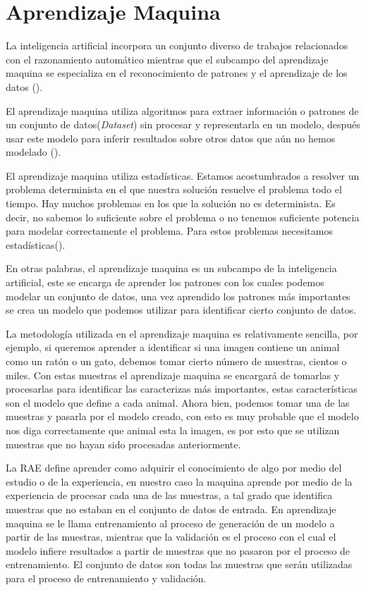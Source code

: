 \section{Aprendizaje Maquina}
\label{sec:MachineLearning}

La inteligencia artificial incorpora un conjunto diverso de trabajos relacionados con el razonamiento automático mientras que el subcampo del aprendizaje maquina se especializa en el reconocimiento de patrones y el aprendizaje de los datos (\cite{rosebrock2017deep}).

El aprendizaje maquina utiliza algoritmos para extraer información o patrones de un conjunto de datos(\textit{Dataset}) sin procesar y representarla en un modelo, después usar este modelo para inferir resultados sobre otros datos que aún no hemos modelado (\cite{patterson2017deep}).

El aprendizaje maquina utiliza estadísticas. Estamos acostumbrados a resolver un problema determinista en el que nuestra solución resuelve el problema todo el tiempo. Hay muchos problemas en los que la solución no es determinista. Es decir, no sabemos lo suficiente sobre el problema o no tenemos suficiente potencia para modelar correctamente el problema. Para estos problemas necesitamos estadísticas(\cite{harrington2012Machine}).

En otras palabras, el aprendizaje maquina es un subcampo de la inteligencia artificial, este se encarga de aprender los patrones con los cuales podemos modelar un conjunto de datos, una vez aprendido los patrones más importantes se crea un modelo que podemos utilizar para identificar cierto conjunto de datos.

La metodología utilizada en el aprendizaje maquina es relativamente sencilla, por ejemplo, si queremos aprender a identificar si una imagen contiene un animal como un ratón o un gato, debemos tomar cierto número de muestras, cientos o miles. Con estas muestras el aprendizaje maquina se encargará de tomarlas y procesarlas para identificar las caracterizas más importantes, estas características son el modelo que define a cada animal. Ahora bien, podemos tomar una de las muestras y pasarla por el modelo creado, con esto es muy probable que el modelo nos diga correctamente que animal esta la imagen, es por esto que se utilizan muestras que no hayan sido procesadas anteriormente.

La RAE define aprender como adquirir el conocimiento de algo por medio del estudio o de la experiencia, en nuestro caso la maquina aprende por medio de la experiencia de procesar cada una de las muestras, a tal grado que identifica muestras que no estaban en el conjunto de datos de entrada. En aprendizaje maquina se le llama entrenamiento al proceso de generación de un modelo a partir de las muestras, mientras que la validación es el proceso con el cual el modelo infiere resultados a partir de muestras que no pasaron por el proceso de entrenamiento. El conjunto de datos son todas las muestras que serán utilizadas para el proceso de entrenamiento y validación.

